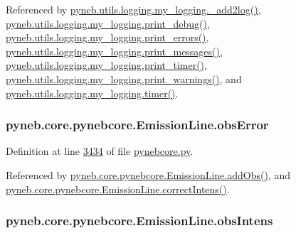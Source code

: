 Referenced by \hyperlink{logging_8py_source_l00059}{pyneb.\-utils.\-logging.\-my\-\_\-logging.\-\_\-add2log()}, \hyperlink{logging_8py_source_l00157}{pyneb.\-utils.\-logging.\-my\-\_\-logging.\-print\-\_\-debug()}, \hyperlink{logging_8py_source_l00149}{pyneb.\-utils.\-logging.\-my\-\_\-logging.\-print\-\_\-errors()}, \hyperlink{logging_8py_source_l00133}{pyneb.\-utils.\-logging.\-my\-\_\-logging.\-print\-\_\-messages()}, \hyperlink{logging_8py_source_l00165}{pyneb.\-utils.\-logging.\-my\-\_\-logging.\-print\-\_\-timer()}, \hyperlink{logging_8py_source_l00141}{pyneb.\-utils.\-logging.\-my\-\_\-logging.\-print\-\_\-warnings()}, and \hyperlink{logging_8py_source_l00115}{pyneb.\-utils.\-logging.\-my\-\_\-logging.\-timer()}.

\hypertarget{classpyneb_1_1core_1_1pynebcore_1_1_emission_line_a4434ba9895df707a62bf375cd0e6e9c0}{
\subsubsection[{obs\-Error}]{\setlength{\rightskip}{0pt plus 5cm}pyneb.\-core.\-pynebcore.\-Emission\-Line.\-obs\-Error}}\label{classpyneb_1_1core_1_1pynebcore_1_1_emission_line_a4434ba9895df707a62bf375cd0e6e9c0}


Definition at line \hyperlink{pynebcore_8py_source_l03434}{3434} of file \hyperlink{pynebcore_8py_source}{pynebcore.\-py}.



Referenced by \hyperlink{pynebcore_8py_source_l03469}{pyneb.\-core.\-pynebcore.\-Emission\-Line.\-add\-Obs()}, and \hyperlink{pynebcore_8py_source_l03447}{pyneb.\-core.\-pynebcore.\-Emission\-Line.\-correct\-Intens()}.

\hypertarget{classpyneb_1_1core_1_1pynebcore_1_1_emission_line_a8ac6d9eaaf4eb17606577a858edb1d71}{
\subsubsection[{obs\-Intens}]{\setlength{\rightskip}{0pt plus 5cm}pyneb.\-core.\-pynebcore.\-Emission\-Line.\-obs\-Intens}}\label{classpyneb_1_1core_1_1pynebcore_1_1_emission_line_a8ac6d9eaaf4eb17606577a858edb1d71}


